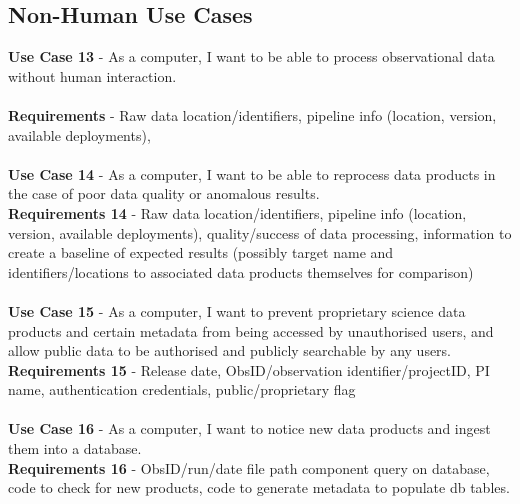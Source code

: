 \subsection{Non-Human Use Cases}
{\bf Use Case 13} - As a computer, I want to be able to process observational data without human interaction. 
\\
\\
{\bf Requirements} - Raw data location/identifiers, pipeline info (location, version, available deployments),
\\\\
{\bf Use Case 14} -  As a computer, I want to be able to reprocess data products in the case of poor data quality or anomalous results.   
\\
{\bf Requirements 14} - Raw data location/identifiers, pipeline info (location, version, available deployments), quality/success of data processing, information to create a baseline of expected results (possibly target name and identifiers/locations to associated data products themselves for comparison)
\\\\
{\bf Use Case 15} - As a computer, I want to prevent proprietary science data products and certain metadata from being accessed by unauthorised users, and allow public data to be authorised and publicly searchable by any users.
\\
{\bf Requirements 15} - Release date, ObsID/observation identifier/projectID, PI name, authentication credentials, public/proprietary flag
\\\\
{\bf Use Case 16} - As a computer, I want to notice new data products and ingest them into a database. 
\\
{\bf Requirements 16} - ObsID/run/date file path component query on database, code to check for new products, code to generate metadata to populate db tables.